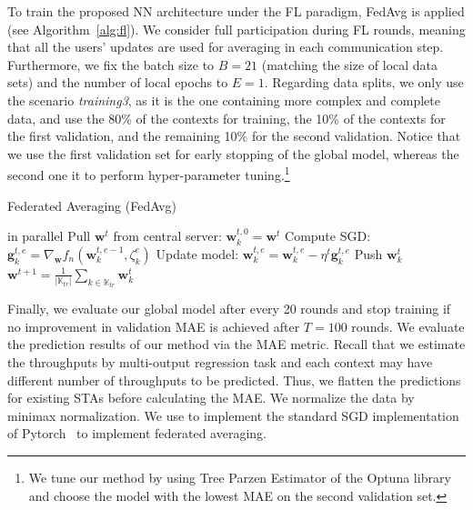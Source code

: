 \documentclass[10pt,a4paper,twocolumn]{article}
\newcommand{\ITUpar}{\vspace{8pt}\par}
\begin{document}
To train the proposed NN architecture under the FL paradigm, FedAvg is applied (see Algorithm~\ref{alg:fl}). We consider full participation during FL rounds, meaning that all the users' updates are used for averaging in each communication step. Furthermore, we fix the batch size to $B=21$ (matching the size of local data sets) and the number of local epochs to $E=1$. Regarding data splits, we only use the scenario \textit{training3}, as it is the one containing more complex and complete data, and use the 80\% of the contexts for training, the 10\% of the contexts for the first validation, and the remaining 10\% for the second validation. Notice that we use the first validation set for early stopping of the global model, whereas the second one it to perform hyper-parameter tuning.\footnote{We tune our method by using Tree Parzen Estimator of the Optuna library~\cite{akiba2019optuna} and choose the model with the lowest MAE on the second validation set.}\ITUpar

\begin{algorithm}[t!]
	\caption{Federated Averaging (FedAvg) }\label{alg:fl}
	\begin{algorithmic}[1]
		 in parallel
		\State Pull $\boldsymbol{w}^{t}$ from central server: $\boldsymbol{w}_{k}^{t,0}=\boldsymbol{w}^{t}$
		\State Compute SGD: $\mathbf{g}^{t,e}_{k}=\nabla_{\boldsymbol{w}}f_{n}(\boldsymbol{w}^{t,e-1}_{k},\zeta_{k}^e)$
		\State Update model: $\boldsymbol{w}_{k}^{t,e}=\boldsymbol{w}^{t,e}_{k}-\eta^{t}\mathbf{g}^{t,e}_{k}$
		\EndFor
		\State Push $\boldsymbol{w}^{t}_{k}$
		\EndFor
		 $\boldsymbol{w}^{t+1}=\frac{1}{ \vert \mathbb{K}_{tr} \vert}\sum_{k\in\mathbb{K}_{tr}} \boldsymbol{w}^{t}_{k}$
		\EndFor
	\end{algorithmic}
\end{algorithm}

Finally, we evaluate our global model after every 20 rounds and stop training if no improvement in validation MAE is achieved after $T=100$ rounds. We evaluate the prediction results of our method via the MAE metric. Recall that we estimate the throughputs by multi-output regression task and each context may have different number of throughputs to be predicted. Thus, we flatten the predictions for existing STAs before calculating the MAE. We normalize the data by minimax normalization. We use to implement the standard SGD implementation of Pytorch~\cite{paszke2017automatic} to implement federated averaging.\ITUpar
\end{document}
